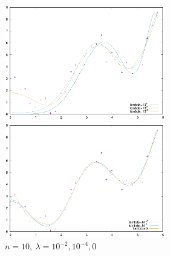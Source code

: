 \documentclass[dvipdfmx,autodetect-engine]{jsarticle}%
\begin{document}
\begin{figure}[htbp]
 \begin{minipage}{0.5\hsize}
  \begin{center}
   \includegraphics[width=70mm]{10_big.eps}
  \end{center}
  \caption{$n=10,~\lambda = 10^4,10^2,~0^0$}
  \label{10_big}
 \end{minipage}
 \begin{minipage}{0.5\hsize}
  \begin{center}
   \includegraphics[width=70mm]{10_small.eps}
  \end{center}
  \caption{$n=10,~\lambda = 10^{-2},10^{-4},0$}
  \label{10_small}
 \end{minipage}
\end{figure}
\end{document}
